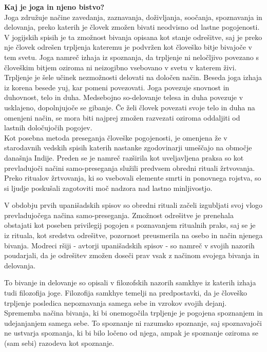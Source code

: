 \documentclass[a4paper, 12pt]{book}
\begin{document}
\textbf{Kaj je joga in njeno bistvo?}\\

Joga združuje načine zavedanja, zaznavanja, doživljanja, soočanja, spoznavanja in delovanja, preko katerih je človek zmožen bivati neodvisno od lastne pogojenosti. V jogijskih spisih je ta zmožnost bivanja opisana kot stanje odrešitve, saj je preko nje človek odrešen trpljenja kateremu je podvržen kot človeško bitje bivajoče v tem svetu. Joga namreč izhaja iz spoznanja, da trpljenje ni neločljivo povezano s človeškim bitjem oziroma ni neizogibno vsebovano v svetu v katerem živi. Trpljenje je šele učinek nezmožnosti delovati na določen način. Beseda joga izhaja iz korena besede yuj, kar pomeni povezovati. Joga povezuje snovnost in duhovnost, telo in duha. Medsebojno so-delovanje telesa in duha povezuje v usklajeno, dopolnjujoče se gibanje. Če želi človek povezati svoje telo in duha na omenjeni način, se mora biti najprej zmožen razvezati oziroma oddaljiti od lastnih določujočih pogojev.~\cite{oJogi}\\ 

Kot posebna metoda preseganja človeške pogojenosti, je omenjena že v starodavnih vedskih spisih katerih nastanke zgodovinarji umeščajo na območje današnja Indije. Preden se je namreč razširila kot uveljavljena praksa so kot prevladujoči načini samo-preseganja služili predvsem obredni rituali žrtvovanja. Preko ritualov žrtvovanja, ki so vsebovali elemente smrti in ponovnega rojstva, so si ljudje poskušali zagotoviti moč nadzora nad lastno minljivostjo. 

V obdobju prvih upanišadskih spisov so obredni rituali začeli izgubljati svoj vlogo prevladujočega načina samo-preseganja. Zmožnost odrešitve je prenehala obstajati kot poseben privilegij pogojen s poznavanjem ritualnih praks, saj se je iz rituala, kot sredstva odrešitve, pozornost preusmerila na osebo in način njenega bivanja. Modreci ršiji - avtorji upanišadskih spisov - so namreč v svojih nazorih poudarjali, da je odrešitev zmožen doseči prav vsak z načinom svojega bivanja in delovanja.

To bivanje in delovanje so opisali v filozofskih nazorih samkhye iz katerih izhaja tudi filozofija joge. Filozofija samkhye temelji na predpostavki, da je človeško trpljenje posledica nepoznavanja samega sebe in vzrokov svojih dejanj. Sprememba načina bivanja, ki bi onemogočila trpljenje je pogojena spoznanjem in udejanjanjem samega sebe. To spoznanje ni razumsko spoznanje, saj spoznavajoči ne ustvarja spoznanja, ki bi bilo ločeno od njega, ampak je spoznanje oziroma se (sam sebi) razodeva kot spoznanje.
\end{document}
